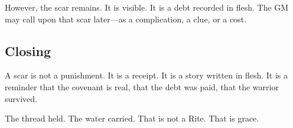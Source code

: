 However, the scar remains. It is visible. It is a debt recorded in flesh. The GM may call upon that scar later—as a complication, a clue, or a cost.

\subsection{Closing}

A scar is not a punishment. It is a receipt. It is a story written in flesh. It is a reminder that the covenant is real, that the debt was paid, that the warrior survived.

The thread held. The water carried. That is not a Rite. That is grace.
